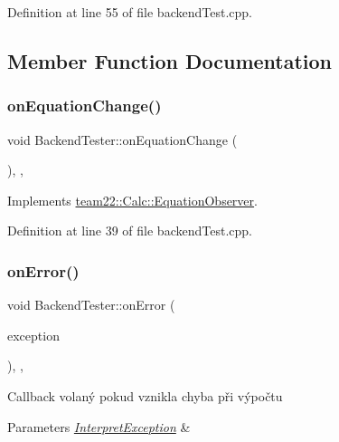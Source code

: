Definition at line 55 of file backend\+Test.\+cpp.



\subsection{Member Function Documentation}
\mbox{\label{class_backend_tester_a9b7caf17f8ad274936fab5ca4bc669f8}} 
\subsubsection{\texorpdfstring{on\+Equation\+Change()}{onEquationChange()}}
{\footnotesize\ttfamily void Backend\+Tester\+::on\+Equation\+Change (\begin{DoxyParamCaption}{ }\end{DoxyParamCaption})\hspace{0.3cm}{\ttfamily [inline]}, {\ttfamily [override]}, {\ttfamily [virtual]}}



Implements \hyperlink{classteam22_1_1_calc_1_1_equation_observer_a2fc2a1f8583f27b0087ff6053895ef25}{team22\+::\+Calc\+::\+Equation\+Observer}.



Definition at line 39 of file backend\+Test.\+cpp.

\mbox{\label{class_backend_tester_a9f83f432f7d71304026ff07caf20a65d}} 
\subsubsection{\texorpdfstring{on\+Error()}{onError()}}
{\footnotesize\ttfamily void Backend\+Tester\+::on\+Error (\begin{DoxyParamCaption}\item[{\hyperlink{class_interpret_exception}{Interpret\+Exception}}]{exception }\end{DoxyParamCaption})\hspace{0.3cm}{\ttfamily [inline]}, {\ttfamily [override]}, {\ttfamily [virtual]}}

Callback volaný pokud vznikla chyba při výpočtu 
\begin{DoxyParams}{Parameters}
{\em \hyperlink{class_interpret_exception}{Interpret\+Exception}} & \\
\hline
\end{DoxyParams}


